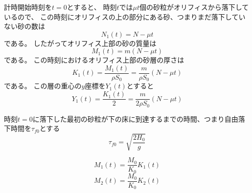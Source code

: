\documentclass[]{article}
\begin{document}
計時開始時刻を$t=0$とすると、
時刻$t$では$\mu t$個の砂粒がオリフィスから落下しているので、
この時刻にオリフィスの上の部分にある砂、つまりまだ落下していない砂の数は
\begin{equation} \label{250703152453} 
   N_1(t) =  N - \mu t
\end{equation}
である。
したがってオリフィス上部の砂の質量は
\begin{equation} \label{250703152655} 
   M_1(t) = m (N-\mu t)
\end{equation}
である。
この時刻におけるオリフィス上部の砂層の厚さは
\begin{equation} \label{250703152748} 
   K_1(t) = \frac{M_1(t)}{\rho S_0} = \frac{m}{\rho S_0}(N-\mu t)
\end{equation}
である。
この層の重心の$y$座標を$Y_1(t)$とすると
\begin{equation} \label{250703153013} 
   Y_1(t) = \frac{K_1(t)}{2} = \frac{m}{2\rho S_0} ( N - \mu t)
\end{equation}


時刻$t=0$に落下した最初の砂粒が下の床に到達するまでの時間、つまり自由落下時間を$\tau_{f0}$とする
\begin{equation} \label{250703153227} 
   \tau_{f0} = \sqrt{\frac{2H_0}{g}}
\end{equation}


\color{blue}

\begin{equation} \label{250917175554} 
   M_1(t) = \frac{M_0}{K_0} K_1(t)
\end{equation}
\begin{equation} \label{250917175633} 
   M_2(t) =  \frac{M_0}{K_0} K_2(t)
\end{equation}
\end{document}
